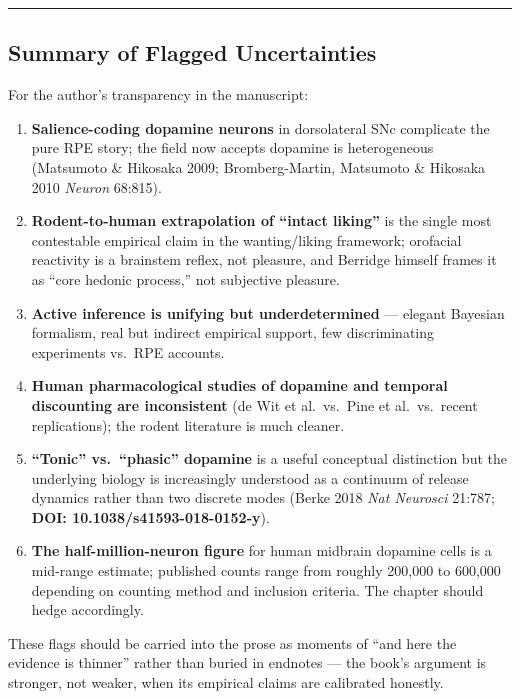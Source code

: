 \begin{center}\rule{0.5\linewidth}{0.5pt}\end{center}

\subsection{Summary of Flagged Uncertainties}\label{01_dopamine_substrate-summary-of-flagged-uncertainties}

For the author's transparency in the manuscript:

\begin{enumerate}
\def\labelenumi{\arabic{enumi}.}
\tightlist
\item
  \textbf{Salience-coding dopamine neurons} in dorsolateral SNc complicate the pure RPE story; the field now accepts dopamine is heterogeneous (Matsumoto \& Hikosaka 2009; Bromberg-Martin, Matsumoto \& Hikosaka 2010 \emph{Neuron} 68:815).
\item
  \textbf{Rodent-to-human extrapolation of ``intact liking''} is the single most contestable empirical claim in the wanting/liking framework; orofacial reactivity is a brainstem reflex, not pleasure, and Berridge himself frames it as ``core hedonic process,'' not subjective pleasure.
\item
  \textbf{Active inference is unifying but underdetermined} --- elegant Bayesian formalism, real but indirect empirical support, few discriminating experiments vs.~RPE accounts.
\item
  \textbf{Human pharmacological studies of dopamine and temporal discounting are inconsistent} (de Wit et al.~vs.~Pine et al.~vs.~recent replications); the rodent literature is much cleaner.
\item
  \textbf{``Tonic'' vs.~``phasic'' dopamine} is a useful conceptual distinction but the underlying biology is increasingly understood as a continuum of release dynamics rather than two discrete modes (Berke 2018 \emph{Nat Neurosci} 21:787; \textbf{DOI: 10.1038/s41593-018-0152-y}).
\item
  \textbf{The half-million-neuron figure} for human midbrain dopamine cells is a mid-range estimate; published counts range from roughly 200,000 to 600,000 depending on counting method and inclusion criteria. The chapter should hedge accordingly.
\end{enumerate}

These flags should be carried into the prose as moments of ``and here the evidence is thinner'' rather than buried in endnotes --- the book's argument is stronger, not weaker, when its empirical claims are calibrated honestly.
